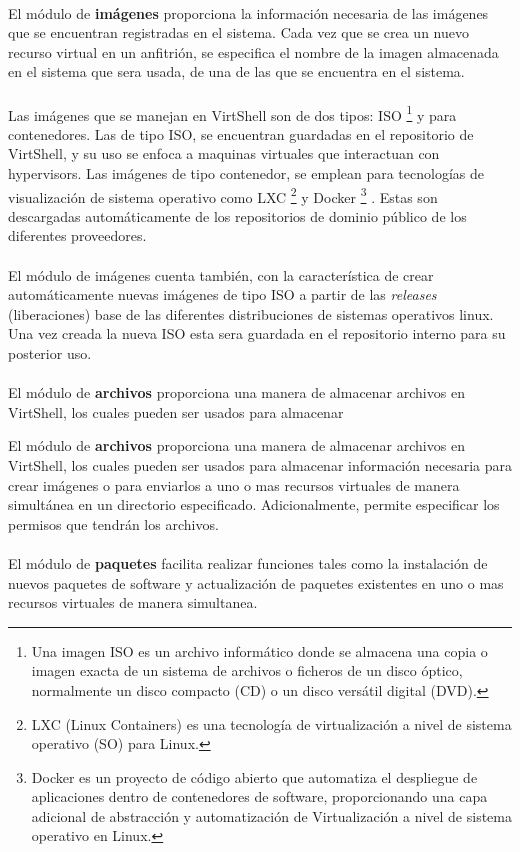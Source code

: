 \documentclass[conference, spanish]{IEEEtran}
\begin{document}
\\
El módulo de \textbf{imágenes} proporciona la información necesaria de las imágenes que se encuentran registradas en el sistema. Cada vez que se crea un nuevo recurso virtual en un anfitrión, se especifica el nombre de la imagen almacenada en el sistema que sera usada, de una de las que se encuentra en el sistema. \\
\\
Las imágenes que se manejan en VirtShell son de dos tipos: ISO \footnote{Una imagen ISO es un archivo informático donde se almacena una copia o imagen exacta de un sistema de archivos o ficheros de un disco óptico, normalmente un disco compacto (CD) o un disco versátil digital (DVD).} y para contenedores. Las de tipo ISO, se encuentran guardadas en el repositorio de VirtShell, y su uso se enfoca a maquinas virtuales que interactuan con hypervisors. Las imágenes de tipo contenedor, se emplean para tecnologías de visualización de sistema operativo como LXC \footnote{LXC (Linux Containers) es una tecnología de virtualización a nivel de sistema operativo (SO) para Linux. } \cite{lxc16} y Docker \footnote{Docker es un proyecto de código abierto que automatiza el despliegue de aplicaciones dentro de contenedores de software, proporcionando una capa adicional de abstracción y automatización de Virtualización a nivel de sistema operativo en Linux.} \cite{docker16}. Estas son descargadas automáticamente de los repositorios de dominio público de los diferentes proveedores. \\
\\
El módulo de imágenes cuenta también, con la característica de crear automáticamente nuevas imágenes de tipo ISO a partir de las \emph{releases} (liberaciones) base de las diferentes distribuciones de sistemas operativos linux. Una vez creada la nueva ISO esta sera guardada en el repositorio interno para su posterior uso.\\
\\
El módulo de \textbf{archivos} proporciona una manera de almacenar archivos en VirtShell, los cuales pueden ser usados para almacenar 

El módulo de \textbf{archivos} proporciona una manera de almacenar archivos en VirtShell, los cuales pueden ser usados para almacenar información necesaria para crear imágenes o para enviarlos a uno o mas recursos virtuales de manera simultánea en un directorio especificado. Adicionalmente, permite especificar los permisos que tendrán los archivos.\\
\\
El módulo de \textbf{paquetes} facilita realizar funciones tales como la instalación de nuevos paquetes de software y actualización de paquetes existentes en uno o mas recursos virtuales de manera simultanea.
\end{document}
